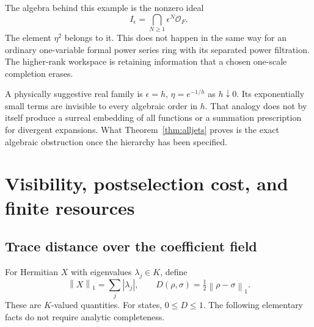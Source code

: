 \documentclass[11pt,oneside]{article}
\numberwithin{equation}{section}
\theoremstyle{plain}
\theoremstyle{definition}
\theoremstyle{remark}
\newcommand{\OO}{\mathcal O}
\newcommand{\abs}[1]{\left|#1\right|}
\newcommand{\norm}[1]{\left\|#1\right\|}
\begin{document}
The algebra behind this example is the nonzero ideal
\begin{equation}
 I_\epsilon=\bigcap_{N\ge1}\epsilon^N\OO_F.
\end{equation}
The element $\eta^2$ belongs to it. This does not happen in the same way for an ordinary one-variable formal power series ring with its separated power filtration. The higher-rank workspace is retaining information that a chosen one-scale completion erases.

A physically suggestive real family is $\epsilon=h$, $\eta=e^{-1/h}$ as $h\downarrow0$. Its exponentially small terms are invisible to every algebraic order in $h$. That analogy does not by itself produce a surreal embedding of all functions or a summation prescription for divergent expansions. What Theorem~\ref{thm:alljets} proves is the exact algebraic obstruction once the hierarchy has been specified.

\section{Visibility, postselection cost, and finite resources}\label{sec:cost}

\subsection{Trace distance over the coefficient field}
For Hermitian $X$ with eigenvalues $\lambda_j\in K$, define
\[
 \norm{X}_1=\sum_j\abs{\lambda_j},\qquad
 D(\rho,\sigma)=\tfrac12\norm{\rho-\sigma}_1.
\]
These are $K$-valued quantities. For states, $0\le D\le1$. The following elementary facts do not require analytic completeness.
\end{document}
